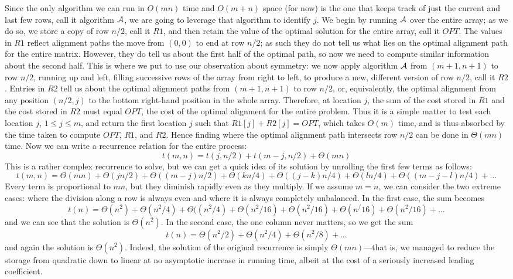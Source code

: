 \documentclass[11pt]{article}
\begin{document}
Since the only algorithm we can run in $O(mn)$ time and $O(m+n)$ space
(for now) is the one that keeps track of just the current and last few
rows, call it algorithm $\cal{A}$, we are going to leverage that algorithm
to identify $j$.  We begin by running $\cal{A}$ over the entire array; as
we do so, we store a copy of row $n/2$, call it $R1$, and then retain
the value of the optimal solution for the entire array, call it $OPT$.
The values in $R1$ reflect alignment paths the move from $(0,0)$ to
end at row $n/2$; as such they do not tell us what lies on the optimal
alignment path for the entire matrix.  However, they do tell us about the
first half of the optimal path, so now we need to compute similar information
about the second half.  This is where we put to use our observation about
symmetry: we now apply algorithm $\cal{A}$ from $(m+1,n+1)$ to row $n/2$,
running up and left, filling successive rows of the array from right to left,
to produce a new, different version of row $n/2$, call it $R2$. Entries
in $R2$ tell us about the optimal alignment paths from $(m+1,n+1)$ to row
$n/2$, or, equivalently, the optimal alignment from any position $(n/2,j)$ to
the bottom right-hand position in the whole array.  Therefore, at location $j$,
the sum of the cost stored in $R1$ and the cost stored in $R2$ must equal
$OPT$, the cost of the optimal alignment for the entire problem.
Thus it is a simple matter to test each location $j$, $1\leq j\leq m$,
and return the first location $j$ such that $R1[j]+R2[j]=OPT$, which takes
$O(m)$ time, and is thus absorbed by the time taken to compute $OPT$,
$R1$, and $R2$.   Hence finding where the optimal alignment path intersects
row $n/2$ can be done in $\Theta(mn)$ time.  Now we can write a recurrence
relation for the entire process:
  $$t(m,n) = t(j,n/2) + t(m-j,n/2) + \Theta(mn)$$
This is a rather complex recurrence to solve, but we can get a quick idea
of its solution by unrolling the first few terms as follows:
  $$t(m,n) = \Theta(mn) + \Theta(jn/2) + \Theta((m-j)n/2) + \Theta(kn/4) + \Theta((j-k)n/4) + \Theta(ln/4) + \Theta((m-j-l)n/4)+\ldots$$
Every term is  proportional to $mn$, but they diminish rapidly even as they
multiply.  If we assume $m=n$, we can consider the two extreme cases:
where the division along a row is always even and where it is always
completely unbalanced.  In the first case, the sum becomes
  $$t(n) = \Theta(n^2) + \Theta(n^2/4) + \Theta((n^2/4) + \Theta(n^2/16) + \Theta(n^2/16) + \Theta(n^/16) + \Theta(n^2/16)+\ldots$$
and we can see that the solution is $\Theta(n^2)$.  In the second case,
the one column never matters, so we get the sum
  $$t(n) = \Theta(n^2/2) + \Theta(n^2/4) + \Theta(n^2/8) + \ldots$$
and again the solution is $\Theta(n^2)$. Indeed, the solution of the original
recurrence is simply $\Theta(mn)$---that is, we managed to reduce the storage
from quadratic down to linear at no asymptotic increase in running time,
albeit at the cost of a seriously increased leading coefficient.
\end{document}
